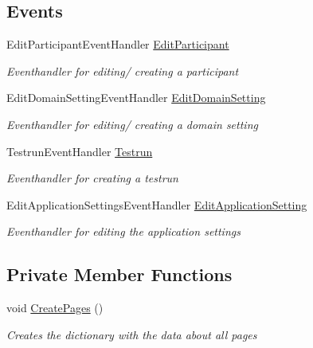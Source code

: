 \subsection*{Events}
\begin{DoxyCompactItemize}
\item 
Edit\+Participant\+Event\+Handler \hyperlink{class_web_analyzer_1_1_u_i_1_1_interaction_objects_1_1_navigation_adc0aa816457297571e9dd44ffe09a372}{Edit\+Participant}
\begin{DoxyCompactList}\small\item\em Eventhandler for editing/ creating a participant \end{DoxyCompactList}\item 
Edit\+Domain\+Setting\+Event\+Handler \hyperlink{class_web_analyzer_1_1_u_i_1_1_interaction_objects_1_1_navigation_ae2d3e814d1fdf232f7443507bb5772e8}{Edit\+Domain\+Setting}
\begin{DoxyCompactList}\small\item\em Eventhandler for editing/ creating a domain setting \end{DoxyCompactList}\item 
Testrun\+Event\+Handler \hyperlink{class_web_analyzer_1_1_u_i_1_1_interaction_objects_1_1_navigation_a34448e99688e6e15b470a981a86a4bba}{Testrun}
\begin{DoxyCompactList}\small\item\em Eventhandler for creating a testrun \end{DoxyCompactList}\item 
Edit\+Application\+Settings\+Event\+Handler \hyperlink{class_web_analyzer_1_1_u_i_1_1_interaction_objects_1_1_navigation_a640f19a0ee9d1c022c0cab2aacf53eec}{Edit\+Application\+Setting}
\begin{DoxyCompactList}\small\item\em Eventhandler for editing the application settings \end{DoxyCompactList}\end{DoxyCompactItemize}
\subsection*{Private Member Functions}
\begin{DoxyCompactItemize}
\item 
void \hyperlink{class_web_analyzer_1_1_u_i_1_1_interaction_objects_1_1_navigation_ac56e103343a7667fe4bab5e449c0942f}{Create\+Pages} ()
\begin{DoxyCompactList}\small\item\em Creates the dictionary with the data about all pages \end{DoxyCompactList}\end{DoxyCompactItemize}
